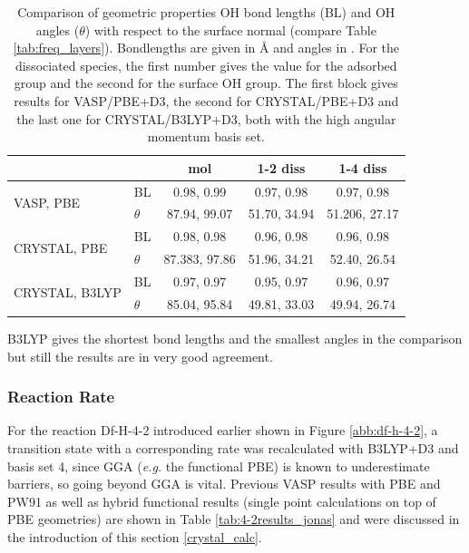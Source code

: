 \documentclass[11pt,DIV=13,BCOR=5mm,a4paper,headinclude]{scrbook}
\begin{document}
\begin{table}[!h]
  \centering
   \caption{Comparison of geometric properties OH bond lengths (BL) and OH angles ($\theta$) with respect to the surface normal (compare Table \ref{tab:freq_layers}).
Bondlengths are given in \AA{} and angles in \textdegree.
For the dissociated species, the first number gives the value for the adsorbed group and the second for the surface OH group.
The first block gives results for VASP/PBE+D3, the second for CRYSTAL/PBE+D3 and the last one for CRYSTAL/B3LYP+D3, both with the high angular momentum basis set.}
  \begin{tabular}{ll|ccc}
  \toprule
   &&mol & 1-2 diss & 1-4 diss \\\midrule
\multirow{2}{*}{VASP, PBE} &BL &0.98, 0.99 &0.97, 0.98 &0.97, 0.98 \\
&$\theta$ &87.94, 99.07 &51.70, 34.94 &51.206, 27.17 \\\midrule
\multirow{2}{*}{CRYSTAL, PBE}&BL &0.98, 0.98 &0.96, 0.98 &0.96, 0.98 \\
&$\theta$ &87.383, 97.86 &51.96, 34.21 &52.40, 26.54 \\\midrule
\multirow{2}{*}{CRYSTAL, B3LYP}& BL &0.97, 0.97 &0.95, 0.97 &0.96, 0.97 \\
&$\theta$ &85.04, 95.84 &49.81, 33.03 &49.94, 26.74 \\\bottomrule
  \end{tabular}
  \label{tab:geom_comp_vasp-crystal}
\end{table}
B3LYP gives the shortest bond lengths and the smallest angles in the comparison but still the results are in very good agreement.

\subsubsection{Reaction Rate}
For the reaction Df-H-4-2 introduced earlier shown in Figure \ref{abb:df-h-4-2}, a transition state with a corresponding rate was recalculated with B3LYP+D3 and basis set 4, since GGA (\textit{e.g.} the functional PBE) is known to underestimate barriers\cite{Zhao05}, so going beyond GGA is vital.
Previous VASP results with PBE and PW91 as well as hybrid functional results (single point calculations on top of PBE geometries) are shown in Table \ref{tab:4-2results_jonas} and were discussed in the introduction of this section \ref{crystal_calc}.
\end{document}
